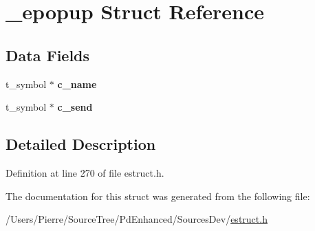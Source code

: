 \hypertarget{struct__epopup}{\section{\-\_\-epopup Struct Reference}
\label{struct__epopup}
}
\subsection*{Data Fields}
\begin{DoxyCompactItemize}
\item 
\hypertarget{struct__epopup_a6b1d595c3eed41231261cc949de6c059}{t\-\_\-symbol $\ast$ {\bfseries c\-\_\-name}}\label{struct__epopup_a6b1d595c3eed41231261cc949de6c059}

\item 
\hypertarget{struct__epopup_a8b8515ab22b24ef7b726fc06af1254fe}{t\-\_\-symbol $\ast$ {\bfseries c\-\_\-send}}\label{struct__epopup_a8b8515ab22b24ef7b726fc06af1254fe}

\end{DoxyCompactItemize}


\subsection{Detailed Description}


Definition at line 270 of file estruct.\-h.



The documentation for this struct was generated from the following file\-:\begin{DoxyCompactItemize}
\item 
/\-Users/\-Pierre/\-Source\-Tree/\-Pd\-Enhanced/\-Sources\-Dev/\hyperlink{estruct_8h}{estruct.\-h}\end{DoxyCompactItemize}
